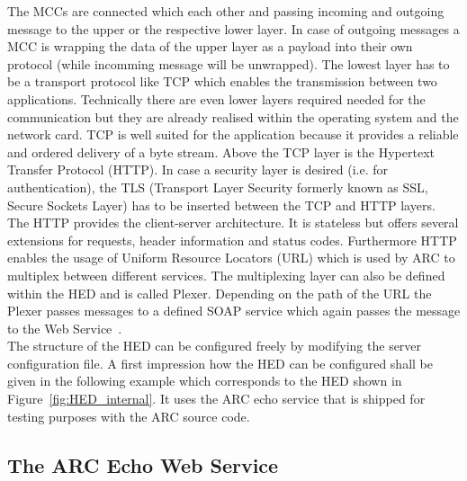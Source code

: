 The MCCs are connected which each other and passing incoming and outgoing message to the upper or the respective lower layer. In case of outgoing messages a MCC is wrapping the data of the upper layer as a payload into their own protocol (while incomming message will be unwrapped).
The lowest layer has to be a transport protocol like TCP which enables the transmission between two applications.
Technically there are even lower layers required needed for the communication but they are already realised within the operating system and the  network card.
TCP is well suited for the application because it provides a reliable and ordered delivery of a byte stream.
Above the TCP layer is the Hypertext Transfer Protocol (HTTP). 
In case a security layer is desired (i.e. for authentication), the TLS (Transport Layer Security formerly known as SSL, Secure Sockets Layer) has to be inserted between the TCP and HTTP layers.
The HTTP provides the client-server architecture. It is stateless but offers several extensions for requests, header information and status codes. Furthermore HTTP enables the usage of Uniform Resource Locators (URL) which is used by ARC to multiplex between different services. The multiplexing layer can also be defined within the HED and is called Plexer.
Depending on the path of the URL the Plexer passes messages to a defined SOAP service which again passes the message to the Web Service~\cite{QIANG_2005}.\\


The structure of the HED can be configured freely by modifying the server configuration file.
A first impression how the HED can be configured shall be given in the following example which corresponds to the HED shown in Figure~\ref{fig:HED_internal}.
It uses the ARC echo service that is shipped for testing purposes with the ARC source code.



\subsection{The ARC Echo Web Service}
\label{sec:arc_echo_web_service}


